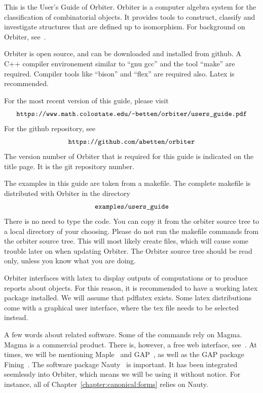 This is the User's Guide of Orbiter. 
Orbiter is a computer algebra system for the classification of combinatorial objects.
It provides tools to construct, classify and investigate structures that are defined up to isomorphism. 
For background on Orbiter, see~\cite{Betten2020}.


\bigskip

Orbiter is open source, and can be downloaded and installed from github.
A C++ compiler environement similar to ``gnu gcc'' 
and the tool ``make'' are required. 
Compiler tools like ``bison'' and ``flex'' are required also. 
Latex is recommended.

\bigskip




For the most recent version of this guide, 
please visit 
$$
\verb'https://www.math.colostate.edu/~betten/orbiter/users_guide.pdf'
$$
For the github repository, see
$$
\verb'https://github.com/abetten/orbiter'
$$
The version number of Orbiter that 
is required for this guide is indicated on the title page. 
It is the git repository number. 

\bigskip


The examples in this guide are taken from a makefile. 
The complete makefile is distributed with Orbiter 
in the directory 
$$
\verb'examples/users_guide'
$$
There is no need to type the code. 
You can copy it from the orbiter source tree to a local directory of your choosing. 
Please do not run the makefile commands from the orbiter source tree. 
This will most likely create files, which will cause some trouble later on when updating Orbiter.
The Orbiter source tree should be read only, unless you know what you are doing.


\bigskip



Orbiter interfaces with latex to display outputs 
of computations or to produce reports about objects. 
For this reason, it is recommended to have a working latex package installed. 
We will assume that pdflatex exists. 
Some latex distributions come with a graphical user interface, 
where the tex file needs to be selected instead. 

\bigskip

A few words about related software.
Some of the commands rely on Magma. Magma is a commercial product. 
There is, however, a free web interface, see~\cite{MagmaOnline}.
At times, we will be mentioning Maple~\cite{Maple} and GAP~\cite{GAP}, 
as well as the GAP package Fining~\cite{fining}. 
The software package Nauty~\cite{Nauty2020} is important. 
It has been integrated seemlessly into Orbiter, which means 
we will be using it without notice. 
For instance, all of Chapter~\ref{chapter:canonical:forms} relies on Nauty.




